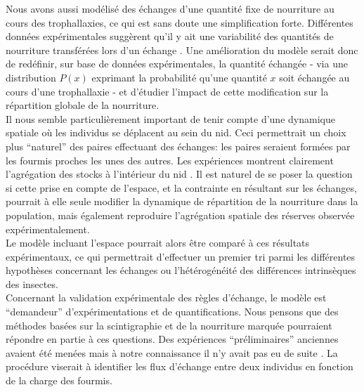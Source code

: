 Nous avons aussi modélisé des échanges d'une quantité fixe de nourriture au cours des trophallaxies, ce qui est sans doute une simplification forte. Différentes données expérimentales suggèrent qu'il y ait une variabilité des quantités de nourriture transférées lors d'un échange \citep{Cassill_1999}. Une amélioration du modèle serait donc de redéfinir, sur base de données expérimentales, la quantité échangée - via une distribution $P(x)$ exprimant la probabilité qu'une quantité $x$ soit échangée au cours d'une trophallaxie - et d'étudier l'impact de cette modification sur la répartition globale de la nourriture.\\

Il nous semble particulièrement important de tenir compte d'une dynamique spatiale où les individus se déplacent au sein du nid. Ceci permettrait un choix plus ``naturel'' des paires effectuant des échanges: les paires seraient formées par les fourmis proches les unes des autres. Les expériences montrent clairement l'agrégation des stocks à l'intérieur du nid \citep{buffin_feeding_2009}. Il est naturel de se poser la question si cette prise en compte de l'espace, et la contrainte en résultant sur les échanges, pourrait à elle seule modifier la dynamique de répartition de la nourriture 	dans la population, mais également reproduire l'agrégation spatiale des réserves observée expérimentalement.\\

Le modèle incluant l'espace pourrait alors être comparé à ces résultats expérimentaux, ce qui permettrait d'effectuer un premier tri parmi les différentes hypothèses concernant les échanges ou l'hétérogénéité des différences intrinsèques des insectes. \\


Concernant la validation expérimentale des règles d'échange, le modèle est ``demandeur'' d'expérimentations et de quantifications. Nous pensons que des méthodes basées sur la scintigraphie et de la nourriture marquée pourraient répondre en partie à ces questions. Des expériences ``préliminaires'' anciennes avaient été menées mais à notre connaissance il n'y avait pas eu de suite \citep{bonavita-cougourdan_nouvelle_1979}. La procédure viserait à identifier les flux d'échange entre deux individus en fonction de la charge des fourmis.\\



%

